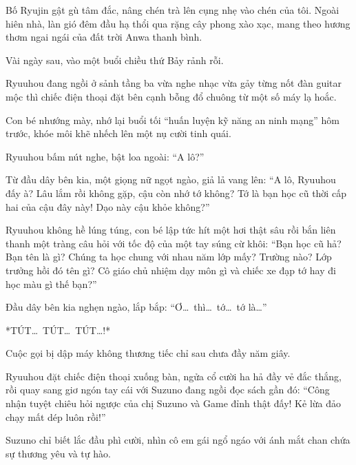 \documentclass[../main.tex]{subfiles}
\begin{document}
Bố Ryujin gật gù tâm đắc, nâng chén trà lên cụng nhẹ vào chén của tôi. Ngoài hiên nhà, làn gió đêm đầu hạ thổi qua rặng cây phong xào xạc, mang theo hương thơm ngai ngái của đất trời Anwa thanh bình.

\omk

Vài ngày sau, vào một buổi chiều thứ Bảy rảnh rỗi.

Ryuuhou đang ngồi ở sảnh tầng ba vừa nghe nhạc vừa gảy từng nốt đàn guitar mộc thì chiếc điện thoại đặt bên cạnh bỗng đổ chuông từ một số máy lạ hoắc.

Con bé nhướng mày, nhớ lại buổi tối ``huấn luyện kỹ năng an ninh mạng'' hôm trước, khóe môi khẽ nhếch lên một nụ cười tinh quái.

Ryuuhou bấm nút nghe, bật loa ngoài: ``A lô?''

Từ đầu dây bên kia, một giọng nữ ngọt ngào, giả lả vang lên: ``A lô, Ryuuhou đấy à? Lâu lắm rồi không gặp, cậu còn nhớ tớ không? Tớ là bạn học cũ thời cấp hai của cậu đây này! Dạo này cậu khỏe không?''

Ryuuhou không hề lúng túng, con bé lập tức hít một hơi thật sâu rồi bắn liên thanh một tràng câu hỏi với tốc độ của một tay súng cừ khôi: ``Bạn học cũ hả? Bạn tên là gì? Chúng ta học chung với nhau năm lớp mấy? Trường nào? Lớp trưởng hồi đó tên gì? Cô giáo chủ nhiệm dạy môn gì và chiếc xe đạp tớ hay đi học màu gì thế bạn?''

Đầu dây bên kia nghẹn ngào, lắp bắp: ``Ơ\dots\ thì\dots\ tớ\dots\ tớ là\dots''

*TÚT\dots\ TÚT\dots\ TÚT\dots!*

Cuộc gọi bị dập máy không thương tiếc chỉ sau chưa đầy năm giây.

Ryuuhou đặt chiếc điện thoại xuống bàn, ngửa cổ cười ha hả đầy vẻ đắc thắng, rồi quay sang giơ ngón tay cái với Suzuno đang ngồi đọc sách gần đó: ``Công nhận tuyệt chiêu hỏi ngược của chị Suzuno và Game đỉnh thật đấy! Kẻ lừa đảo chạy mất dép luôn rồi!''

Suzuno chỉ biết lắc đầu phì cười, nhìn cô em gái ngổ ngáo với ánh mắt chan chứa sự thương yêu và tự hào.
\end{document}
